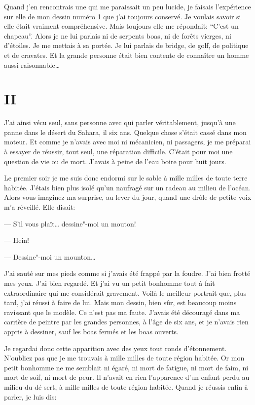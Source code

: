 \begin{Parallel}[p]{}{}
{Quand j'en rencontrais une qui me paraissait un
peu lucide, je faisais l'expérience sur elle de mon
dessin numéro 1 que j'ai toujours conservé. Je voulais savoir si elle était vraiment compréhensive. Mais
toujours elle me répondait: ``C'est un chapeau''.
Alors je ne lui parlais ni de serpents boas, ni de forêts vierges, ni d'étoiles. Je me mettais à sa portée.
Je lui parlais de bridge, de golf, de politique et de
cravates. Et la grande personne était bien contente
de connaître un homme aussi raisonnable\ldots{}

\section{II}

J'ai ainsi vécu seul, sans personne avec qui parler
véritablement, jusqu’à une panne dans le désert du
Sahara, il six ans. Quelque chose s'était cassé
dans mon moteur. Et comme je n'avais avec moi ni
mécanicien, ni passagers, je me préparai à essayer
de réussir, tout seul, une réparation difficile. C'était
pour moi une question de vie ou de mort. J'avais à
peine de l'eau boire pour huit jours.

Le premier soir je me suis donc endormi sur le
sable à mille milles de toute terre habitée. J'étais
bien plus isolé qu'un naufragé sur un radeau au
milieu de l'océan. Alors vous imaginez ma surprise,
au lever du jour, quand une drôle de petite voix m'a
réveillé. Elle disait:

--- S'il vous plaît\ldots{} dessine"-moi un mouton!

--- Hein!

--- Dessine"-moi un mounton\ldots{}

J'ai sauté sur mes pieds comme si j'avais été
frappé par la foudre. J'ai bien frotté mes yeux. J'ai bien regardé. Et j'ai vu un petit bonhomme tout à
fait extraordinaire qui me considérait gravement.
Voilà le meilleur portrait que, plus tard, j'ai réussi à
faire de lui. Mais mon dessin, bien sûr, est beaucoup
moins ravissant que le modèle. Ce n'est pas ma
faute. J'avais été découragé dans ma carrière de
peintre par les grandes personnes, à l'âge de six ans,
et je n'avais rien appris à dessiner, sauf les boas fermés et les boas ouverts.

Je regardai donc cette apparition avec des yeux
tout ronds d'étonnement. N'oubliez pas que je me
trouvais à mille milles de toute région habitée. Or
mon petit bonhomme ne me semblait ni égaré, ni
mort de fatigue, ni mort de faim, ni mort de soif, ni
mort de peur. Il n'avait en rien l'apparence d’un
enfant perdu au milieu du dé sert, à mille milles de
toute région habitée. Quand je réussis enfin à parler, je luis dis:

}
\end{Parallel}
